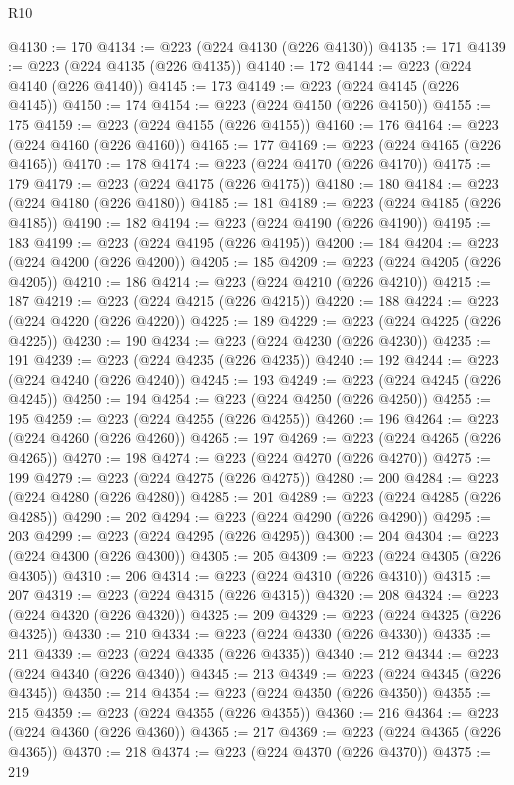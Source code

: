 \begin{lexlean}{R10}
\begin{coremodule}
{{{{{{{{{{{{{{{{{{{{{{{{{{{{{{{{{{{{{{{{{{{{{{{{{{{{{{{{{{{{{{{{{{{{{{{{{{{{{{{{{{{{@4130 := 170
@4134 := @223 (@224 @4130 (@226 @4130))
@4135 := 171
@4139 := @223 (@224 @4135 (@226 @4135))
@4140 := 172
@4144 := @223 (@224 @4140 (@226 @4140))
@4145 := 173
@4149 := @223 (@224 @4145 (@226 @4145))
@4150 := 174
@4154 := @223 (@224 @4150 (@226 @4150))
@4155 := 175
@4159 := @223 (@224 @4155 (@226 @4155))
@4160 := 176
@4164 := @223 (@224 @4160 (@226 @4160))
@4165 := 177
@4169 := @223 (@224 @4165 (@226 @4165))
@4170 := 178
@4174 := @223 (@224 @4170 (@226 @4170))
@4175 := 179
@4179 := @223 (@224 @4175 (@226 @4175))
@4180 := 180
@4184 := @223 (@224 @4180 (@226 @4180))
@4185 := 181
@4189 := @223 (@224 @4185 (@226 @4185))
@4190 := 182
@4194 := @223 (@224 @4190 (@226 @4190))
@4195 := 183
@4199 := @223 (@224 @4195 (@226 @4195))
@4200 := 184
@4204 := @223 (@224 @4200 (@226 @4200))
@4205 := 185
@4209 := @223 (@224 @4205 (@226 @4205))
@4210 := 186
@4214 := @223 (@224 @4210 (@226 @4210))
@4215 := 187
@4219 := @223 (@224 @4215 (@226 @4215))
@4220 := 188
@4224 := @223 (@224 @4220 (@226 @4220))
@4225 := 189
@4229 := @223 (@224 @4225 (@226 @4225))
@4230 := 190
@4234 := @223 (@224 @4230 (@226 @4230))
@4235 := 191
@4239 := @223 (@224 @4235 (@226 @4235))
@4240 := 192
@4244 := @223 (@224 @4240 (@226 @4240))
@4245 := 193
@4249 := @223 (@224 @4245 (@226 @4245))
@4250 := 194
@4254 := @223 (@224 @4250 (@226 @4250))
@4255 := 195
@4259 := @223 (@224 @4255 (@226 @4255))
@4260 := 196
@4264 := @223 (@224 @4260 (@226 @4260))
@4265 := 197
@4269 := @223 (@224 @4265 (@226 @4265))
@4270 := 198
@4274 := @223 (@224 @4270 (@226 @4270))
@4275 := 199
@4279 := @223 (@224 @4275 (@226 @4275))
@4280 := 200
@4284 := @223 (@224 @4280 (@226 @4280))
@4285 := 201
@4289 := @223 (@224 @4285 (@226 @4285))
@4290 := 202
@4294 := @223 (@224 @4290 (@226 @4290))
@4295 := 203
@4299 := @223 (@224 @4295 (@226 @4295))
@4300 := 204
@4304 := @223 (@224 @4300 (@226 @4300))
@4305 := 205
@4309 := @223 (@224 @4305 (@226 @4305))
@4310 := 206
@4314 := @223 (@224 @4310 (@226 @4310))
@4315 := 207
@4319 := @223 (@224 @4315 (@226 @4315))
@4320 := 208
@4324 := @223 (@224 @4320 (@226 @4320))
@4325 := 209
@4329 := @223 (@224 @4325 (@226 @4325))
@4330 := 210
@4334 := @223 (@224 @4330 (@226 @4330))
@4335 := 211
@4339 := @223 (@224 @4335 (@226 @4335))
@4340 := 212
@4344 := @223 (@224 @4340 (@226 @4340))
@4345 := 213
@4349 := @223 (@224 @4345 (@226 @4345))
@4350 := 214
@4354 := @223 (@224 @4350 (@226 @4350))
@4355 := 215
@4359 := @223 (@224 @4355 (@226 @4355))
@4360 := 216
@4364 := @223 (@224 @4360 (@226 @4360))
@4365 := 217
@4369 := @223 (@224 @4365 (@226 @4365))
@4370 := 218
@4374 := @223 (@224 @4370 (@226 @4370))
@4375 := 219
}}}}}}}}}}}}}}}}}}}}}}}}}}}}}}}}}}}}}}}}}}}}}}}}}}}}}}}}}}}}}}}}}}}}}}}}}}}}}}}}}}}}
\end{coremodule}
\end{lexlean}
